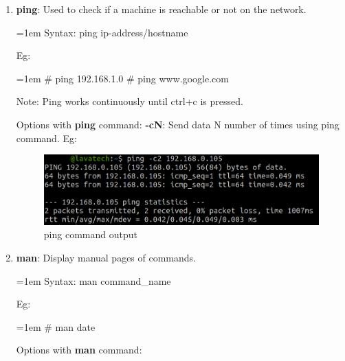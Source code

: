 \begin{flushleft}
\begin{enumerate}
		\newpage
		\item \textbf{ping}: Used to check if a machine is reachable or not on the network.
		\newline
		\begin{tcolorbox}[breakable,notitle,boxrule=1pt,colback=pink,colframe=pink]
			\color{black}
			\font=1em
			Syntax:  ping ip-address/hostname
			\font=4pt
		\end{tcolorbox}
		Eg:
		\begin{tcolorbox}[breakable,notitle,boxrule=1pt,colback=black,colframe=black]
			\color{green}
			\font=1em
			\# ping 192.168.1.0
			\newline
			\# ping www.google.com
			\font=4pt
		\end{tcolorbox}
		\bigskip
		\begin{tcolorbox}[breakable,notitle,boxrule=1pt,colback=yellow,colframe=yellow]
			\color{black}
			Note: Ping works continuously until ctrl+c is pressed.
		\end{tcolorbox}
		\bigskip
		Options with \textbf{ping} command:
		\newline
		\textbf{-cN}: Send data N number of times using ping command.	
		\newline
		Eg:
		\begin{figure}[h!]
			\centering
			\includegraphics[scale=.35]{content/chapter2/images/ping.png}
			\caption{ping command output}
			\label{fig:h1}
		\end{figure}
		\bigskip
		\bigskip
		\item \textbf{man}: Display manual pages of commands.
		\bigskip
		\begin{tcolorbox}[breakable,notitle,boxrule=1pt,colback=pink,colframe=pink]
			\color{black}
			\font=1em
			Syntax: man command\_name
			\font=4pt
		\end{tcolorbox}
		Eg:
		\bigskip
		\begin{tcolorbox}[breakable,notitle,boxrule=1pt,colback=black,colframe=black]
			\color{green}
			\font=1em
			\# man date
			\font=4pt
		\end{tcolorbox}
		Options with \textbf{man} command:

\end{enumerate}
\end{flushleft}
